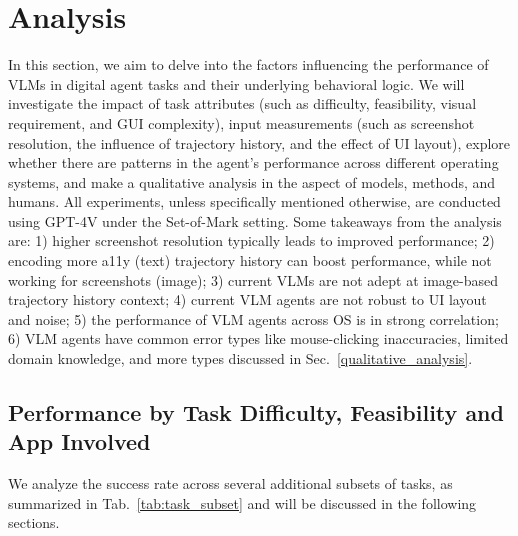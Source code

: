 \section{Analysis}
\vspace{-10pt}
In this section, we aim to delve into the factors influencing the performance of VLMs in digital agent tasks and their underlying behavioral logic. 
We will investigate the impact of task attributes (such as difficulty, feasibility, visual requirement, and GUI complexity), input measurements (such as screenshot resolution, the influence of trajectory history, and the effect of UI layout), explore whether there are patterns in the agent's performance across different operating systems, and make a qualitative analysis in the aspect of models, methods, and humans.
All experiments, unless specifically mentioned otherwise, are conducted using GPT-4V under the Set-of-Mark setting.
Some takeaways from the analysis are:
1) higher screenshot resolution typically leads to improved performance; 
2) encoding more a11y (text) trajectory history can boost performance, while not working for screenshots (image); 
3) current VLMs are not adept at image-based trajectory history context;
4) current VLM agents are not robust to UI layout and noise;
5) the performance of VLM agents across OS is in strong correlation;
6) VLM agents have common error types like mouse-clicking inaccuracies, limited domain knowledge, and more types discussed in Sec.~\ref{qualitative_analysis}.


\subsection{Performance by Task Difficulty, Feasibility and App Involved}
We analyze the success rate across several additional subsets of tasks, as summarized in Tab.~\ref{tab:task_subset} and will be discussed in the following sections.

\begin{table}
\vspace{-15pt}
\caption{Success rate (SR) of GPT-4V (SoM) across different types of tasks.}
\centering
{}
\vspace{-18pt}
\label{tab:task_subset}
\end{table}


